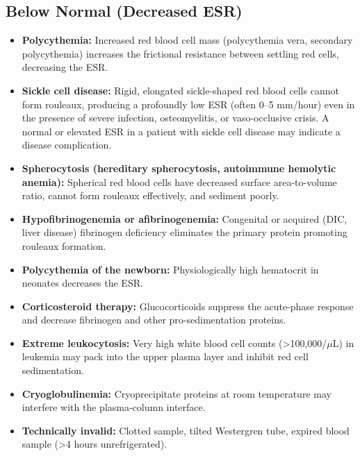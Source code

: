 \subsection*{Below Normal (Decreased ESR)}
\begin{itemize}
  \item \textbf{Polycythemia:} Increased red blood cell mass (polycythemia vera, secondary polycythemia) increases the frictional resistance between settling red cells, decreasing the ESR.
  \item \textbf{Sickle cell disease:} Rigid, elongated sickle-shaped red blood cells cannot form rouleaux, producing a profoundly low ESR (often 0--5 mm/hour) even in the presence of severe infection, osteomyelitis, or vaso-occlusive crisis. A normal or elevated ESR in a patient with sickle cell disease may indicate a disease complication.
  \item \textbf{Spherocytosis (hereditary spherocytosis, autoimmune hemolytic anemia):} Spherical red blood cells have decreased surface area-to-volume ratio, cannot form rouleaux effectively, and sediment poorly.
  \item \textbf{Hypofibrinogenemia or afibrinogenemia:} Congenital or acquired (DIC, liver disease) fibrinogen deficiency eliminates the primary protein promoting rouleaux formation.
  \item \textbf{Polycythemia of the newborn:} Physiologically high hematocrit in neonates decreases the ESR.
  \item \textbf{Corticosteroid therapy:} Glucocorticoids suppress the acute-phase response and decrease fibrinogen and other pro-sedimentation proteins.
  \item \textbf{Extreme leukocytosis:} Very high white blood cell counts (>100,000/$\mu$L) in leukemia may pack into the upper plasma layer and inhibit red cell sedimentation.
  \item \textbf{Cryoglobulinemia:} Cryoprecipitate proteins at room temperature may interfere with the plasma-column interface.
  \item \textbf{Technically invalid:} Clotted sample, tilted Westergren tube, expired blood sample (>4 hours unrefrigerated).
\end{itemize}

